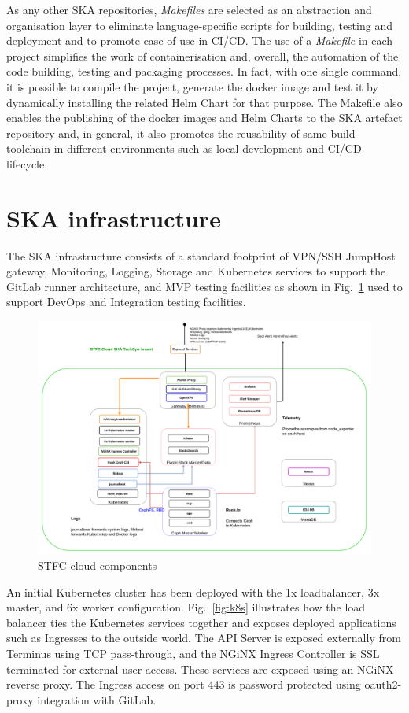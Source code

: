 \documentclass[a4paper,
               keeplastbox,   %
               ]{jacow}
\begin{document}
As any other SKA repositories, \textit{Makefiles} are selected as an abstraction and organisation layer to eliminate language-specific scripts for building, testing and deployment and to promote ease of use in CI/CD. The use of a \textit{Makefile} in each project simplifies the work of containerisation and, overall, the automation of the code building, testing and packaging processes. In fact, with one single command, it is possible to compile the project, generate the docker image and test it by dynamically installing the related Helm Chart for that purpose.
The Makefile also enables the publishing of the docker images and Helm Charts to the SKA artefact repository and, in general, it also promotes the reusability of same build toolchain in different environments such as local development and CI/CD lifecycle.

\section{SKA infrastructure}

The SKA infrastructure consists of a standard footprint of VPN/SSH JumpHost gateway, Monitoring, Logging, Storage and Kubernetes services to support the GitLab runner architecture, and MVP testing facilities as shown in Fig.~\ref{fig:stfc-cloud-component} used to support DevOps and Integration testing facilities.

\begin{figure}[!htb]
    \centering
    \includegraphics*[width=0.8\columnwidth]{stfc-cloud-component}
    \caption{STFC cloud components}
    \label{fig:stfc-cloud-component}
 \end{figure}

 An initial Kubernetes cluster has been deployed with the 1x loadbalancer, 3x master, and 6x worker configuration. Fig.~\ref{fig:k8s} illustrates how the load balancer ties the Kubernetes services together and exposes deployed applications such as Ingresses to the outside world.  The API Server is exposed externally from Terminus using TCP pass-through, and the NGiNX Ingress Controller is SSL terminated for external user access.  These services are exposed using an NGiNX reverse proxy.  The Ingress access on port 443 is password protected using oauth2-proxy integration with GitLab.
\end{document}
